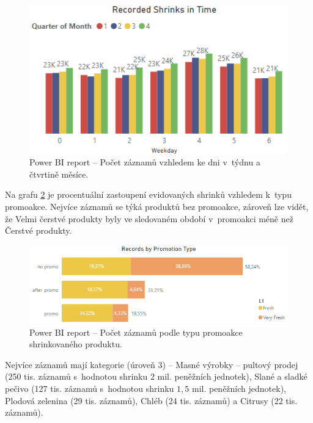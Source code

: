 \begin{figure}[h!]
    \centering
    \captionsetup{justification=centering}
    \includegraphics[width=.6\textwidth]{obrazky/PBI/time.png}
    \caption{Power BI report -- Počet záznamů vzhledem ke dni v~týdnu a čtvrtině měsíce.}
    \label{obr:PBI:time}
\end{figure}

Na grafu \ref*{obr:PBI:promo} je procentuální zastoupení evidovaných shrinků vzhledem k~typu promoakce. Nejvíce záznamů se týká produktů bez promoakce, zároveň lze vidět, že Velmi čerstvé  produkty byly ve sledovaném období v~promoakci méně než Čerstvé produkty.

\begin{figure}[h!]
    \centering
    \captionsetup{justification=centering}
    \includegraphics[width=.8\textwidth]{obrazky/PBI/promotype.png}
    \caption{Power BI report -- Počet záznamů podle typu promoakce \\ shrinkovaného produktu.}
    \label{obr:PBI:promo}
\end{figure}

Nejvíce záznamů mají kategorie (úroveň 3) -- Masné výrobky -- pultový prodej (250 tis. záznamů s~hodnotou shrinku 2 mil. peněžních jednotek), Slané a sladké pečivo (127 tis. záznamů s~hodnotou shrinku $1{,}5$ mil. peněžních jednotek), Plodová zelenina (29 tis. záznamů), Chléb (24 tis. záznamů) a Citrusy (22 tis. záznamů). 


